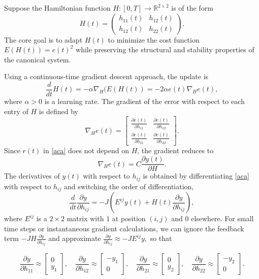 \documentclass[reqno]{amsart}
\numberwithin{equation}{section}
\begin{document}
Suppose the Hamiltonian function 
$
H : [0,T] \to \mathbb{R}^{2 \times 2}
$
 is of the form
\[
H(t) = \begin{pmatrix}
h_{11}(t) & h_{12}(t) \\
h_{12}(t) & h_{22}(t)
\end{pmatrix}. \]
 The core goal is to adapt \(H(t)\) to minimize  the cost function $ E(H(t)) = e(t)^2$ while preserving the structural and stability properties of the canonical system. 

 Using a continuous-time gradient descent approach, the update is
\begin{equation}
\label{eq:gradient_update}
\frac{d}{dt} H(t) = - \alpha \nabla_H (E(H(t))  = - 2 \alpha e(t) \nabla_H e(t),
\end{equation}
where \(\alpha > 0\) is a learning rate.
The gradient of the error with respect to each entry of $H$ is defined by
\begin{equation}
\nabla_H e(t) =
\begin{bmatrix}
\frac{\partial e(t)}{\partial h_{11}} & \frac{\partial e(t)}{\partial h_{12}} \\
\frac{\partial e(t)}{\partial h_{21}} & \frac{\partial e(t)}{\partial h_{22}}
\end{bmatrix}.
\end{equation}
Since \(r(t)\) in \eqref{aca} does not depend on \(H\), the gradient reduces to
\begin{equation} \label{grad}
\nabla_H e(t) = C \frac{\partial y(t)}{\partial H}.
\end{equation}
The derivatives of $y(t)$ with respect to $h_{ij}$  is  obtained by differentiating \eqref{aca} with respect to $h_{ij}$  and switching the order of differentiation, 
\[
\frac{d}{dt} \frac{\partial y}{\partial h_{ij}} = -J \left( E^{ij} y(t) + H(t) \frac{\partial y}{\partial h_{ij}} \right),
\]
where $E^{ij}$ is a $2\times 2$ matrix with $1$ at position $(i,j)$ and $0$ elsewhere.
For small time steps or instantaneous gradient calculations, we can ignore the feedback term $ -J H \frac{\partial y}{\partial h_{ij}}$ and approximate $
\frac{\partial y}{\partial h_{ij}} \approx -J E^{ij} y,$
so that

\begin{equation} \label{grads}
\frac{\partial y}{\partial h_{11}} \approx \begin{bmatrix} 0 \\ y_1 \end{bmatrix}, \quad
\frac{\partial y}{\partial h_{12}} \approx \begin{bmatrix} -y_1 \\ 0 \end{bmatrix}, \quad
\frac{\partial y}{\partial h_{21}} \approx \begin{bmatrix} 0 \\ y_2 \end{bmatrix}, \quad
\frac{\partial y}{\partial h_{22}} \approx \begin{bmatrix} - y_2 \\ 0 \end{bmatrix}.
\end{equation}
\end{document}
